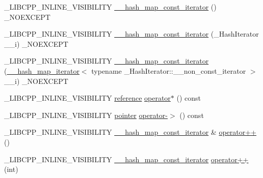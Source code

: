 \begin{DoxyCompactItemize}
\item 
\+\_\+\+L\+I\+B\+C\+P\+P\+\_\+\+I\+N\+L\+I\+N\+E\+\_\+\+V\+I\+S\+I\+B\+I\+L\+I\+T\+Y \hyperlink{class____hash__map__const__iterator_a8901fc740c6c0594c3ef1b58a706bce0}{\+\_\+\+\_\+hash\+\_\+map\+\_\+const\+\_\+iterator} () \+\_\+\+N\+O\+E\+X\+C\+E\+P\+T
\item 
\+\_\+\+L\+I\+B\+C\+P\+P\+\_\+\+I\+N\+L\+I\+N\+E\+\_\+\+V\+I\+S\+I\+B\+I\+L\+I\+T\+Y \hyperlink{class____hash__map__const__iterator_a14aeb0ff1e45f6a666e9b79e3326f714}{\+\_\+\+\_\+hash\+\_\+map\+\_\+const\+\_\+iterator} (\+\_\+\+Hash\+Iterator \+\_\+\+\_\+i) \+\_\+\+N\+O\+E\+X\+C\+E\+P\+T
\item 
\+\_\+\+L\+I\+B\+C\+P\+P\+\_\+\+I\+N\+L\+I\+N\+E\+\_\+\+V\+I\+S\+I\+B\+I\+L\+I\+T\+Y \hyperlink{class____hash__map__const__iterator_a6c078738ef40183c8a60cbbae0926752}{\+\_\+\+\_\+hash\+\_\+map\+\_\+const\+\_\+iterator} (\hyperlink{class____hash__map__iterator}{\+\_\+\+\_\+hash\+\_\+map\+\_\+iterator}$<$ typename \+\_\+\+Hash\+Iterator\+::\+\_\+\+\_\+non\+\_\+const\+\_\+iterator $>$ \+\_\+\+\_\+i) \+\_\+\+N\+O\+E\+X\+C\+E\+P\+T
\item 
\+\_\+\+L\+I\+B\+C\+P\+P\+\_\+\+I\+N\+L\+I\+N\+E\+\_\+\+V\+I\+S\+I\+B\+I\+L\+I\+T\+Y \hyperlink{class____hash__map__const__iterator_a94a3447535fb67a3c48b0acded52fd84}{reference} \hyperlink{class____hash__map__const__iterator_a29b28fdb1a679d414a1f36f577af803c}{operator$\ast$} () const 
\item 
\+\_\+\+L\+I\+B\+C\+P\+P\+\_\+\+I\+N\+L\+I\+N\+E\+\_\+\+V\+I\+S\+I\+B\+I\+L\+I\+T\+Y \hyperlink{class____hash__map__const__iterator_a4bb73ff2685ed4941c03a85bf4248e90}{pointer} \hyperlink{class____hash__map__const__iterator_aab7c3eb3cdeaf1a4eb3e4508d3129515}{operator-\/$>$} () const 
\item 
\+\_\+\+L\+I\+B\+C\+P\+P\+\_\+\+I\+N\+L\+I\+N\+E\+\_\+\+V\+I\+S\+I\+B\+I\+L\+I\+T\+Y \hyperlink{class____hash__map__const__iterator}{\+\_\+\+\_\+hash\+\_\+map\+\_\+const\+\_\+iterator} \& \hyperlink{class____hash__map__const__iterator_a666dafa51ea2877d72be115e0a7bf8fe}{operator++} ()
\item 
\+\_\+\+L\+I\+B\+C\+P\+P\+\_\+\+I\+N\+L\+I\+N\+E\+\_\+\+V\+I\+S\+I\+B\+I\+L\+I\+T\+Y \hyperlink{class____hash__map__const__iterator}{\+\_\+\+\_\+hash\+\_\+map\+\_\+const\+\_\+iterator} \hyperlink{class____hash__map__const__iterator_adc8b42a6df32d9978e15e3c2107cafd4}{operator++} (int)
\end{DoxyCompactItemize}

